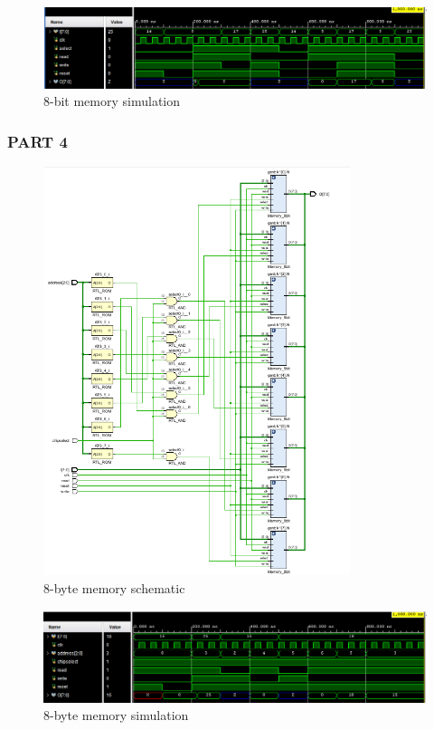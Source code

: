 \documentclass[pdftex,12pt,a4paper]{article}
\begin{document}
    \begin{figure}[H]
    	\centering
    	\includegraphics[width=1\textwidth]{simulations/8bit_sim.png}	
    	\caption{8-bit memory simulation}
    	\label{8-bit memory simulation}
    \end{figure}


\hypertarget{hype4}{}
\subsubsection{PART 4}

\begin{figure}[H]
    	\centering
    	\includegraphics[width=0.8\textwidth]{schematic/8byte_schem.png}	
    	\caption{8-byte memory schematic}
    	\label{8-byte memory schematic}
    \end{figure}
    
    \begin{figure}[H]
    	\centering
    	\includegraphics[width=1\textwidth]{simulations/8byte_sim.png}	
    	\caption{8-byte memory simulation}
    	\label{8-byte memory simulation}
    \end{figure}
\end{document}
